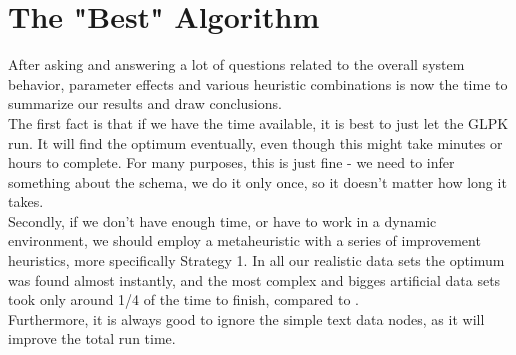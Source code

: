 \section{The "Best" Algorithm}

After asking and answering a lot of questions related to the overall system behavior, parameter effects and various heuristic combinations is now the time to summarize our results and draw conclusions.\\

The first fact is that if we have the time available, it is best to just let the GLPK run. It will find the optimum eventually, even though this might take minutes or hours to complete. For many purposes, this is just fine - we need to infer something about the schema, we do it only once, so it doesn't matter how long it takes.\\

Secondly, if we don't have enough time, or have to work in a dynamic environment, we should employ a metaheuristic with a series of improvement heuristics, more specifically Strategy 1. In all our realistic data sets the optimum was found almost instantly, and the most complex and bigges artificial data sets took only around 1/4 of the time to finish, compared to .\\

Furthermore, it is always good to ignore the simple text data nodes, as it will improve the total run time.
